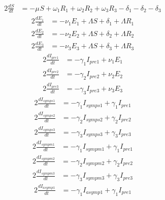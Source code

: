 \documentclass{article}%
\begin{document}
%
\begin{alignat*}{2}%
\frac{dS}{dt} &= -\mu_{} S +  \omega_{1} R_{1} +  \omega_{2} R_{2} +  \omega_{3} R_{3}  -\delta_{1}  -\delta_{2}  -\delta_{3}%
\end{alignat*}%
\begin{alignat*}{2}%
\frac{dE_{1}}{dt} &= -\nu_{1} E_{1} +  \Lambda S +  \delta_{1} +  \Lambda R_{1}%
\end{alignat*}%
\begin{alignat*}{2}%
\frac{dE_{2}}{dt} &= -\nu_{2} E_{2} +  \Lambda S +  \delta_{2} +  \Lambda R_{2}%
\end{alignat*}%
\begin{alignat*}{2}%
\frac{dE_{3}}{dt} &= -\nu_{3} E_{3} +  \Lambda S +  \delta_{3} +  \Lambda R_{3}%
\end{alignat*}%
\begin{alignat*}{2}%
\frac{dI_{pre1}}{dt} &= -\gamma_{1} I_{pre1} +  \nu_{1} E_{1}%
\end{alignat*}%
\begin{alignat*}{2}%
\frac{dI_{pre2}}{dt} &= -\gamma_{2} I_{pre2} +  \nu_{2} E_{2}%
\end{alignat*}%
\begin{alignat*}{2}%
\frac{dI_{pre3}}{dt} &= -\gamma_{3} I_{pre3} +  \nu_{3} E_{3}%
\end{alignat*}%
\begin{alignat*}{2}%
\frac{dI_{symps1}}{dt} &= -\gamma_{1} I_{symps1} +  \gamma_{1} I_{pre1}%
\end{alignat*}%
\begin{alignat*}{2}%
\frac{dI_{symps2}}{dt} &= -\gamma_{2} I_{symps2} +  \gamma_{2} I_{pre2}%
\end{alignat*}%
\begin{alignat*}{2}%
\frac{dI_{symps3}}{dt} &= -\gamma_{3} I_{symps3} +  \gamma_{3} I_{pre3}%
\end{alignat*}%
\begin{alignat*}{2}%
\frac{dI_{sympm1}}{dt} &= -\gamma_{1} I_{sympm1} +  \gamma_{1} I_{pre1}%
\end{alignat*}%
\begin{alignat*}{2}%
\frac{dI_{sympm2}}{dt} &= -\gamma_{2} I_{sympm2} +  \gamma_{2} I_{pre2}%
\end{alignat*}%
\begin{alignat*}{2}%
\frac{dI_{sympm3}}{dt} &= -\gamma_{3} I_{sympm3} +  \gamma_{3} I_{pre3}%
\end{alignat*}%
\begin{alignat*}{2}%
\frac{dI_{asymp1}}{dt} &= -\gamma_{1} I_{asymp1} +  \gamma_{1} I_{pre1}%
\end{alignat*}%
\end{document}
